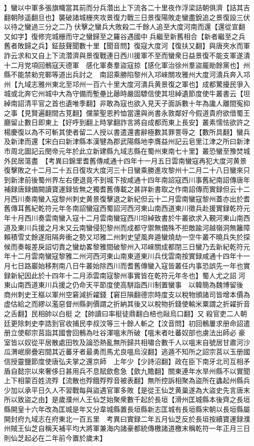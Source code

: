 】蠻以中軍多張旗幟當其前而分兵濳出上下流各二十里夜作浮梁詰朝俱濟【詰其吉翻朝陟遥翻旦也】襲破諸城栅夾攻景復力戰三日景復陽敗走蠻盡銳追之景復設三伏以待之蠻過三分之二乃伏擊之蠻兵大敗殺二千餘人追至大度河南而還【還從宣翻又如字】復修完城栅而守之蠻歸至之羅谷遇國中兵繼至新舊相合【新者繼至之兵舊者敗歸之兵】鉦鼓聲聞數十里【聞音問】復寇大度河【復扶又翻】與唐夾水而軍詐云求和又自上下流濳濟與景復戰連日西川援軍不至而蠻衆日益景復不能支軍遂潰　十二月党項回鶻寇天德軍　感化軍奏羣盜寇掠【感化軍治徐州羣盜龎勛餘黨也】州縣不能禁勑兖鄆等道出兵討之　南詔乘勝陷黎州入邛崍關攻雅州大度河潰兵奔入邛州【九域志雅州東北至邛州一百六十里大度河潰兵黄景復之軍也】成都驚擾民爭入城或北奔它州城中大為守備而塹壘比曏時嚴固驃信使其坦綽遺節度使牛叢書云【坦綽南詔清平官之首也遺唯季翻】非敢為寇也欲入見天子面訴數十年為讒人離間寃抑之事【見賢遍翻間古莧翻】儻蒙聖恩矜恤當還與尚書永敦鄰好今假道貴府欲借蜀王廳留止數日即東上【好呼到翻上時掌翻詐言將自成都而東上長安】叢素懦怯欲許之楊慶復以為不可斬其使者留二人授以書遣還書辭極數其罪詈辱之【數所具翻】蠻兵及新津而還【宋白曰新津縣本漢犍為郡武陽縣地李膺益州記云皂里江津之所曰新津市周北圖記云閔帝元年於此立新建縣九域志縣在蜀州東南七十里】叢恐蠻至豫焚城外民居蕩盡　【考異曰錦里耆舊傳咸通十四年十一月五日雲南蠻寇再犯大度河黄景復擊敗之十二月二十五日復攻大度河三十日蠻乘勝進攻黎州十二月二十八日蠻來只到新津前後蜀州界左右便退竟不到城下按咸通十四年南詔寇西川事舊紀南詔傳唐年補録唐録備闕讀寶運録皆無之獨耆舊傳載之甚詳新書取之作南詔傳而實録但云十二月西川奏南蠻入寇黎州刺史黄景復擊退之新紀但云十二月雲南蠻寇黎州蓋亦出於耆舊傳耳舊紀乾符元年冬南詔蠻寇西蜀詔河西河東山南西道東川徵兵赴援實録乾符元年十月西川奏雲南蠻入寇十二月雲南蠻寇西川坦綽致書於牛叢欲求入覲河東山南西道及東川兵援之月末又云南蠻侵犯黎州而成都守禦無備殊不拒敵踰河越嶺洞無籬障賴積雪丈餘遂阻隔奔衝之勢又邛雅二州刺史望風奔遁蠻燒劫一空牛叢不曉兵失於探候而奏報差戾詔切責之蠻劫畧黎雅間破黎州入邛崍關成都閉三日蠻乃去新紀乾符元年十二月雲南蠻寇黎雅二州河西河東山南東道東川兵伐雲南按實録咸通十四年十一月七日路巖始移荆南八日牛叢始除西川而耆舊傳蠻入寇皆叢任内事恐誤先一年也實録新紀因此於十四年十二月添雲南寇黎州事實皆在乾符元年冬也】蜀人尤之詔河東山南西道東川兵援之仍命天平節度使高駢詣西川制置蠻事　以韓簡為魏博留後　商州刺史王樞以軍州空窘減折糴錢【窘巨隕翻德宗時度支以稅物頒諸司皆增本價為虚估給之而繆以濫惡督州縣剥價謂之折納其後又以稅物折錢使輸米粟謂之折糴折音之舌翻】民相帥以白梃之【帥讀曰率梃徒鼎翻白棓也敺烏口翻】又殺官吏二人朝廷更除刺史李誥到官收捕民李叔汶等三十餘人斬之【汶音問】初回鶻屢求册命詔遣册立使郗宗莒詣其國會回鶻為吐谷渾嗢末所破【嗢末者吐蕃奴部也虜法出師必豪室皆以奴從平居散處田牧及論恐熱亂無所歸共相嘯合數千人以嗢末自號居甘肅河沙瓜渭岷廓疊宕間其近蕃牙者最勇而馬尤良嗢烏沒翻】逃遁不知所之詔宗莒以玉册國信授靈鹽節度使唐弘夫掌之還京師　上年少【少詩沼翻】政在臣下南牙北司互相矛盾自懿宗以來奢侈日甚用兵不息賦歛愈急【歛九贍翻】關東連年水旱州縣不以實聞上下相蒙百姓流殍【流散也殍餓殍殍音被表翻】無所控訴相聚為盜所在蠭起州縣兵少加以承平日久人不習戰每與盜遇官軍多敗【是從王仙芝黄巢遂為大盜史先言唐末所以致盜之由】是歲濮州人王仙芝始聚衆數千起於長垣【滑州匡城縣本後齊之長垣縣開皇十六年改為匡城是年又分韋城縣置長垣縣新志匡城有長垣縣宋朝以長垣縣屬開封府九域志在府東北一百五里　考異曰實録二年五月仙芝反於長垣按續寶運録濮州賊王仙芝自稱天補平均大將軍兼海内諸豪都統傳檄諸道檄末稱乾符一年正月三日則仙芝起必在二年前今置於歲末】

